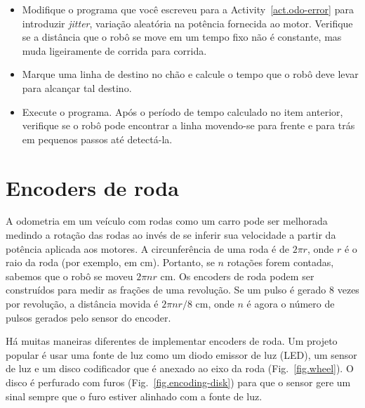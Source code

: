\begin{framed}
\begin{itemize}
\item Modifique o programa que você escreveu para a Activity~\ref{act.odo-error} para introduzir \emph{jitter}, variação aleatória na potência fornecida ao motor. Verifique se a distância que o robô se move em um tempo fixo não é constante, mas muda ligeiramente de corrida para corrida.
\item Marque uma linha de destino no chão e calcule o tempo que o robô deve levar para alcançar tal destino.
\item Execute o programa. Após o período de tempo calculado no item anterior, verifique se o robô pode encontrar a linha movendo-se para frente e para trás em pequenos passos até detectá-la.
\end{itemize}
\end{framed}

\section{Encoders de roda}\label{s.wheel}

A odometria em um veículo com rodas como um carro pode ser melhorada medindo a rotação das rodas ao invés de se inferir sua velocidade a partir da potência aplicada aos motores. A circunferência de uma roda é de $2\pi r$, onde $r$ é o raio da roda (por exemplo, em cm). Portanto, se $n$ rotações forem contadas, sabemos que o robô se moveu $2\pi n r$ cm. Os encoders de roda podem ser construídos para medir as frações de uma revolução. Se um pulso é gerado $8$ vezes por revolução, a distância movida é $2\pi nr /8$ cm, onde $n$ é agora o número de pulsos gerados pelo sensor do encoder.

Há muitas maneiras diferentes de implementar encoders de roda. Um projeto popular é usar uma fonte de luz como um diodo emissor de luz (LED), um sensor de luz e um disco codificador que é anexado ao eixo da roda (Fig.~\ref{fig.wheel}). O disco é perfurado com furos (Fig.~\ref{fig.encoding-disk}) para que o sensor gere um sinal sempre que o furo estiver alinhado com a fonte de luz.

